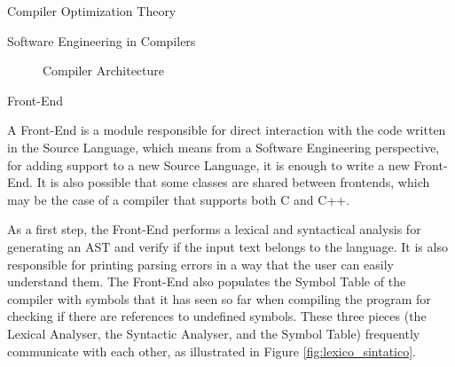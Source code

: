 \begin{section}{Compiler Optimization Theory}
\begin{section}{Software Engineering in Compilers}
\begin{figure}
\begin{center}
{
}
\end{center}

\caption{Compiler Architecture}
\label{fig:compiler_arch}
\end{figure}

\begin{subsection}{Front-End}

A Front-End is a module responsible for direct interaction with the code
written in the Source Language, which means from a Software Engineering
perspective, for adding support to a new Source Language, it is enough to write
a new Front-End. It is also possible that some classes are shared between
frontends, which may be the case of a compiler that supports both C and C++.



As a first step, the Front-End performs a lexical and syntactical analysis for
generating an AST and verify if the input text belongs to the language. It is
also responsible for printing parsing errors in a way that the user can easily
understand them. The Front-End also populates the Symbol Table of the compiler
with symbols that it has seen so far when compiling the program for checking if
there are references to undefined symbols. These three pieces (the Lexical
Analyser, the Syntactic Analyser, and the Symbol Table) frequently communicate
with each other, as illustrated in Figure \ref{fig:lexico_sintatico}.



\end{subsection}
\end{section}
\end{section}
